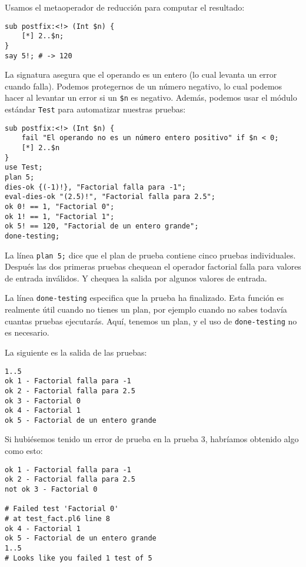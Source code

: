 Usamos el metaoperador de reducción para computar el resultado:

\begin{verbatim}
sub postfix:<!> (Int $n) {
    [*] 2..$n;
}
say 5!; # -> 120
\end{verbatim}


La signatura asegura que el operando es un entero (lo cual levanta
un error cuando falla). Podemos protegernos de un número negativo,
lo cual podemos hacer al levantar un error si un \verb|$n| es
negativo. Además, podemos usar el módulo estándar {\tt Test} 
para automatizar nuestras pruebas:

\begin{verbatim}
sub postfix:<!> (Int $n) {
    fail "El operando no es un número entero positivo" if $n < 0;
    [*] 2..$n
}
use Test;
plan 5;
dies-ok {(-1)!}, "Factorial falla para -1";
eval-dies-ok "(2.5)!", "Factorial falla para 2.5";
ok 0! == 1, "Factorial 0";
ok 1! == 1, "Factorial 1";
ok 5! == 120, "Factorial de un entero grande";
done-testing;
\end{verbatim}

La línea {\tt plan 5;} dice que el plan de prueba contiene 
cinco pruebas individuales. Después las dos primeras pruebas
chequean el operador factorial falla para valores de entrada
inválidos. Y chequea la salida por algunos valores de entrada.

La línea {\tt done-testing} especifica que la prueba ha finalizado.
Esta función es realmente útil cuando no tienes un plan, por ejemplo
cuando no sabes todavía cuantas pruebas ejecutarás. Aquí, tenemos un
plan, y el uso de {\tt done-testing}  no es necesario.

La siguiente es la salida de las pruebas:

\begin{verbatim}
1..5
ok 1 - Factorial falla para -1
ok 2 - Factorial falla para 2.5
ok 3 - Factorial 0
ok 4 - Factorial 1
ok 5 - Factorial de un entero grande
\end{verbatim}

Si hubiésemos tenido un error de prueba en la prueba 3, 
habríamos obtenido algo como esto:

\begin{verbatim}
ok 1 - Factorial falla para -1
ok 2 - Factorial falla para 2.5
not ok 3 - Factorial 0

# Failed test 'Factorial 0'
# at test_fact.pl6 line 8
ok 4 - Factorial 1
ok 5 - Factorial de un entero grande
1..5
# Looks like you failed 1 test of 5
\end{verbatim}

